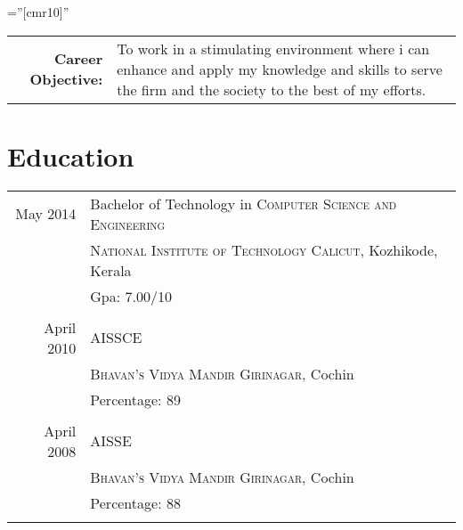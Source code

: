 \documentclass[a4paper,10pt]{article} %
\begin{document}
\pagestyle{empty} %

\font\fb=''[cmr10]'' %


\par{\bigskip\par} %

\begin{tabular}{rp{11cm}}
        \textbf{Career Objective:} & \textsf{To work in a stimulating environment where i can enhance and apply my knowledge and skills to serve the firm and the society to the best of my efforts.} \\
\end{tabular}


\section{Education}

\begin{tabular}{rl}
        \textsf{May 2014}  & \textsf{Bachelor of Technology in} \textsc{Computer Science and Engineering}\\
                           & \textsc{National Institute of Technology Calicut}, \textsf{Kozhikode, Kerala}\\
                           & \textsf{Gpa: 7.00/10}\\
                           &\\


        \textsf{April 2010} & \textsc{AISSCE} \\
                            &\textsc{Bhavan's Vidya Mandir Girinagar}, \textsf{Cochin}\\
                            &\textsf{Percentage: 89} \\
                            &\\

        \textsf{April 2008} & \textsc{AISSE} \\
                            & \textsc{Bhavan's Vidya Mandir Girinagar}, \textsf{Cochin}\\
                            & \textsf{Percentage}: 88 \\
                            &\\
\end{tabular}
\end{document}
